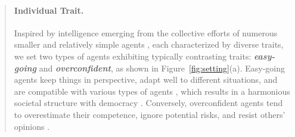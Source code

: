 \documentclass[11pt]{article}
\newcommand{\customcomment}[3]{\textcolor{#1}{[#2:#3]}}
\newcommand{\bh}[1]{\customcomment{blue}{BH}{#1}}
\begin{document}
\begin{abstract}
\paragraph{Individual Trait.}
Inspired by intelligence emerging from the collective efforts of numerous smaller and relatively simple agents \citep{Book1988_SoM}, each characterized by diverse traits, 
we set two types of agents exhibiting typically contrasting traits: \textbf{\textit{easy-going}} and \textbf{\textit{overconfident}}, as shown in Figure~\ref{fig:setting}(a). %
Easy-going agents keep things in perspective, adapt well to different situations, and are compatible with various types of agents \citep{Book1999_Personality}, which results in a harmonious societal structure with democracy \citep{Book2006_Deliberative-Democracy,Book2006_DemocracyModel}. 
Conversely, overconfident agents tend to overestimate their competence, ignore potential risks, and resist others' opinions \citep{J2008_Overconfidence}. 


\end{abstract}
\end{document}
